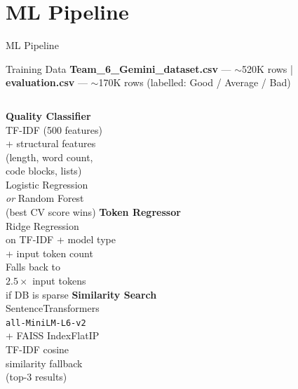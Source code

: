 \documentclass[aspectratio=169]{beamer}
\begin{document}
\section{ML Pipeline}
\begin{frame}{ML Pipeline}
  \begin{block}{Training Data}
    \textbf{Team\_6\_Gemini\_dataset.csv} — $\sim$520K rows \quad|\quad
    \textbf{evaluation.csv} — $\sim$170K rows (labelled: Good / Average / Bad)
  \end{block}
  \vspace{0.4em}
  \begin{columns}
    \centering
    \textbf{Quality Classifier}\\[4pt]
    TF-IDF (500 features)\\
    + structural features\\
    (length, word count,\\
    code blocks, lists)\\[4pt]
    Logistic Regression\\
    \textit{or} Random Forest\\
    (best CV score wins)
    \centering
    \textbf{Token Regressor}\\[4pt]
    Ridge Regression\\
    on TF-IDF + model type\\
    + input token count\\[4pt]
    Falls back to\\
    $2.5\times$ input tokens\\
    if DB is sparse
    \centering
    \textbf{Similarity Search}\\[4pt]
    SentenceTransformers\\
    \texttt{all-MiniLM-L6-v2}\\
    + FAISS IndexFlatIP\\[4pt]
    TF-IDF cosine\\
    similarity fallback\\
    (top-3 results)
  \end{columns}
\end{frame}

\end{document}
